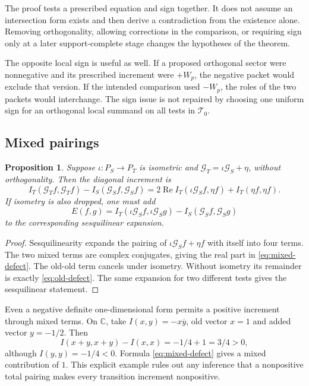 \documentclass[11pt,letterpaper]{article}
\newtheorem{proposition}[theorem]{Proposition}
\theoremstyle{definition}
\theoremstyle{remark}
\newcommand{\C}{\mathbb C}
\newcommand{\T}{\mathcal T}
\begin{document}
The proof tests a prescribed equation and sign together.
It does not assume an intersection form exists and then
derive a contradiction from the existence alone. Removing
orthogonality, allowing corrections in the comparison, or
requiring sign only at a later support-complete stage changes
the hypotheses of the theorem.

The opposite local sign is useful as well. If a proposed
orthogonal sector were nonnegative and its prescribed
increment were $+W_p$, the negative packet would exclude
that version. If the intended comparison used $-W_p$, the
roles of the two packets would interchange. The sign issue
is not repaired by choosing one uniform sign for an
orthogonal local summand on all tests in $\T_0$.

\subsection{Mixed pairings}

\begin{proposition}
\label{prop:polarization-obstructions:mixed}
Suppose $\iota:P_S\to P_T$ is isometric and
$\mathcal G_T=\iota\mathcal G_S+\eta$, without orthogonality.
Then the diagonal increment is
\begin{equation}
 I_T(\mathcal G_Tf,\mathcal G_Tf)-I_S(\mathcal G_Sf,\mathcal G_Sf)
 =2\operatorname{Re}I_T(\iota\mathcal G_Sf,\eta f)
 +I_T(\eta f,\eta f).
 \label{eq:mixed-defect}
\end{equation}
If isometry is also dropped, one must add
\begin{equation}
 E(f,g)=I_T(\iota\mathcal G_Sf,\iota\mathcal G_Sg)
       -I_S(\mathcal G_Sf,\mathcal G_Sg)
 \label{eq:old-defect}
\end{equation}
to the corresponding sesquilinear expansion.
\end{proposition}
\begin{proof}
Sesquilinearity expands the pairing of
$\iota\mathcal G_Sf+\eta f$ with itself into four terms.
The two mixed terms are complex conjugates, giving the real
part in \eqref{eq:mixed-defect}. The old-old term cancels
under isometry. Without isometry its remainder is exactly
\eqref{eq:old-defect}. The same expansion for two different
tests gives the sesquilinear statement.
\end{proof}

Even a negative definite one-dimensional form permits a
positive increment through mixed terms. On $\C$, take
$I(x,y)=-x\overline y$, old vector $x=1$ and added vector
$y=-1/2$. Then
\[
 I(x+y,x+y)-I(x,x)=-1/4+1=3/4>0,
\]
although $I(y,y)=-1/4<0$. Formula
\eqref{eq:mixed-defect} gives a mixed contribution of $1$.
This explicit example rules out any inference that a
nonpositive total pairing makes every transition increment
nonpositive.
\end{document}
